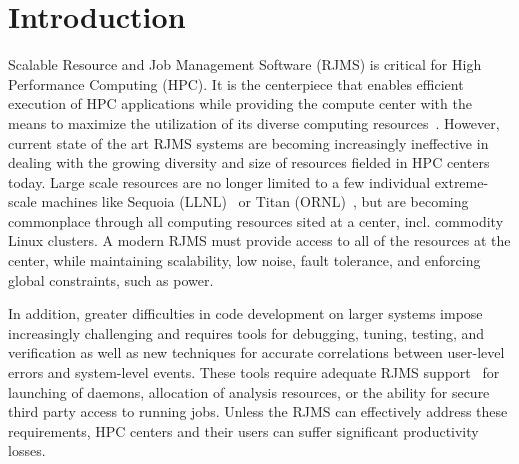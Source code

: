 \section{Introduction}

Scalable Resource and Job Management Software (RJMS) is critical
for High Performance Computing (HPC).
It is the centerpiece that enables efficient
execution of HPC applications while providing
the compute center with the means
to maximize the utilization of its diverse  
 computing resources~\cite{GeorgiouThesis}.
However, current state of the art RJMS systems 
are becoming increasingly
ineffective in dealing with the growing diversity and size 
of resources fielded in HPC centers today. Large
scale resources are no longer limited to  
a few individual 
extreme-scale machines like Sequoia (LLNL)~\cite{sequoia} or Titan (ORNL)~\cite{titan}, 
but are becoming commonplace through all computing resources sited at a center, incl.
commodity Linux clusters.
A modern RJMS must provide access to all of the resources at the center,
while maintaining
scalability, low noise, fault tolerance, and enforcing global constraints, such as power.

In addition, greater difficulties in code development
on larger systems impose increasingly challenging
and requires tools for 
debugging, tuning, testing, and verification
as well as new techniques for 
accurate correlations between user-level errors
and system-level events.
These tools
require adequate RJMS support~\cite{STAT,SPINDLE,PRUNER,SCR,launchmon}
for launching of daemons, allocation of analysis resources, or the ability
for secure third party access to running jobs.
Unless the RJMS can effectively
address these requirements, HPC centers and their users 
can suffer significant productivity losses.

